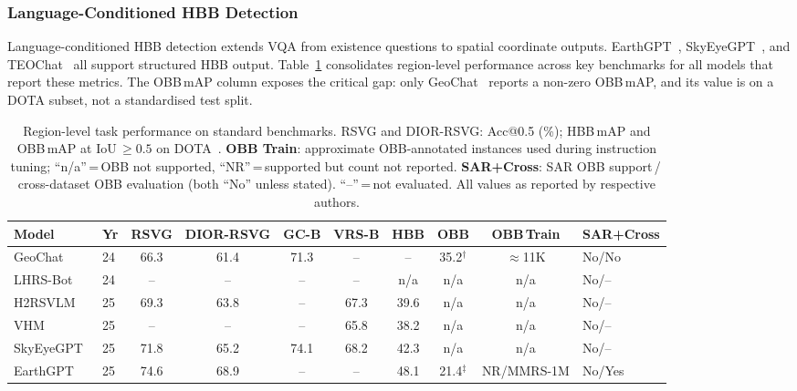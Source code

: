 \subsubsection{Language-Conditioned HBB Detection}\label{sec4:hbbdet}

Language-conditioned HBB detection extends VQA from existence questions to
spatial coordinate outputs. EarthGPT~\cite{earthgpt2025}, SkyEyeGPT~\cite{skyeyegpt2025},
and TEOChat~\cite{teochat2025} all support structured HBB output.
Table~\ref{tab:region_perf} consolidates region-level performance across key
benchmarks for all models that report these metrics. The OBB\,mAP column
exposes the critical gap: only GeoChat~\cite{geochat2024} reports a non-zero
OBB\,mAP, and its value is on a DOTA subset, not a standardised test split.

\begin{table}[t]
\caption{Region-level task performance on standard benchmarks.
RSVG and DIOR-RSVG: Acc@0.5 (\%); HBB\,mAP and OBB\,mAP at IoU\,$\geq\!0.5$
on DOTA~\cite{xia2018dota}. \textbf{OBB Train}: approximate OBB-annotated instances used
during instruction tuning; ``n/a''\,=\,OBB not supported, ``NR''\,=\,supported but count
not reported. \textbf{SAR+Cross}: SAR OBB support\,/\,cross-dataset OBB evaluation
(both ``No'' unless stated). ``--''\,=\,not evaluated.
All values as reported by respective authors.}\label{tab:region_perf}
\tiny\setlength\tabcolsep{2pt}
\begin{tabular*}{\textwidth}{@{\extracolsep\fill}lp{0.25cm}cccccccp{1.3cm}}
\toprule
\textbf{Model} & \textbf{Yr} &
\textbf{RSVG} & \textbf{DIOR-RSVG} &
\textbf{GC-B} & \textbf{VRS-B} &
\textbf{HBB} & \textbf{OBB} &
\textbf{OBB\,Train} & \textbf{SAR+Cross} \\
\midrule
GeoChat~\cite{geochat2024}
  & 24 & 66.3 & 61.4 & 71.3 & -- & -- & 35.2$^\dagger$ & $\approx$11K & No/No \\
LHRS-Bot~\cite{lhrsbot2024}
  & 24 & -- & -- & -- & -- & n/a & n/a & n/a & No/-- \\
H2RSVLM~\cite{h2rsvlm2025}
  & 25 & 69.3 & 63.8 & -- & 67.3 & 39.6 & n/a & n/a & No/-- \\
VHM~\cite{vhm2025}
  & 25 & -- & -- & -- & 65.8 & 38.2 & n/a & n/a & No/-- \\
SkyEyeGPT~\cite{skyeyegpt2025}
  & 25 & 71.8 & 65.2 & 74.1 & 68.2 & 42.3 & n/a & n/a & No/-- \\
EarthGPT~\cite{earthgpt2025}
  & 25 & 74.6 & 68.9 & -- & -- & 48.1 & 21.4$^\ddagger$ & NR/MMRS-1M & No/Yes \\

\end{tabular*}
\end{table}
